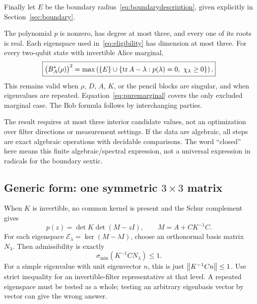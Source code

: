 Finally let $E$ be the boundary radius~\eqref{eq:boundarydescription}, given explicitly in Section~\ref{sec:boundary}.

\begin{theorem}
\label{thm:main}
The polynomial $p$ is nonzero, has degree at most three, and every one of its roots is real. Each eigenspace used in~\eqref{eq:eligibility} has dimension at most three. For every two-qubit state with invertible Alice marginal,
\begin{equation}
 \boxed{\bigl(B_A^*(\rho)\bigr)^2
 =\max\left(\{E\}\cup
 \{\operatorname{tr} A-\lambda:p(\lambda)=0,\ \chi_\lambda\ge0\}\right).}
 \label{eq:main}
\end{equation}
This remains valid when $\rho$, $D$, $A$, $K$, or the pencil blocks are singular, and when eigenvalues are repeated. Equation~\eqref{eq:puremarginal} covers the only excluded marginal case. The Bob formula follows by interchanging parties.
\end{theorem}

The result requires at most three interior candidate values, not an optimization over filter directions or measurement settings. If the data are algebraic, all steps are exact algebraic operations with decidable comparisons. The word ``closed'' here means this finite algebraic/spectral expression, not a universal expression in radicals for the boundary sextic.

\subsection{Generic form: one symmetric $3\times3$ matrix}
When $K$ is invertible, no common kernel is present and the Schur complement gives
\begin{equation}
 p(z)=\det K\det(M-zI),\qquad
 \boxed{M=A+CK^{-1}C.}
 \label{eq:genericM}
\end{equation}
For each eigenspace $\mathcal E_\lambda=\ker(M-\lambda I)$, choose an orthonormal basis matrix $N_\lambda$. Then admissibility is exactly
\begin{equation}
 \boxed{\sigma_{\min}(K^{-1}CN_\lambda)\le1.}
 \label{eq:genericeligibility}
\end{equation}
For a simple eigenvalue with unit eigenvector $n$, this is just $\left\lVert K^{-1}Cn\right\rVert\le1$. Use strict inequality for an invertible-filter representative at that level. A repeated eigenspace must be tested as a whole; testing an arbitrary eigenbasis vector by vector can give the wrong answer.

